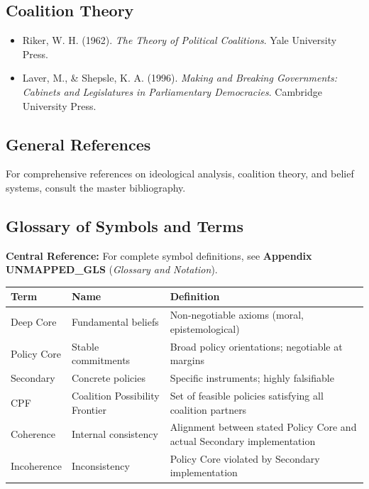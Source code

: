 \subsection{Coalition Theory}

\begin{itemize}[nosep]
\item Riker, W. H. (1962). \textit{The Theory of Political Coalitions}. Yale University Press.

\item Laver, M., \& Shepsle, K. A. (1996). \textit{Making and Breaking Governments: Cabinets and Legislatures in Parliamentary Democracies}. Cambridge University Press.

\end{itemize}

\nocite{bcm_master}

\subsection{General References}

For comprehensive references on ideological analysis, coalition theory, and belief systems, consult the master bibliography.

\subsection{Glossary of Symbols and Terms}

\begin{tcolorbox}[colback=blue!5!white, colframe=blue!75!black]
\textbf{Central Reference:} For complete symbol definitions, see
\textbf{Appendix UNMAPPED_GLS} (\textit{Glossary and Notation}).
\end{tcolorbox}

\begin{table}[h]
\centering
\small
\renewcommand{\arraystretch}{1.3}
\begin{tabular}{@{}llp{6cm}@{}}
\toprule
\textbf{Term} & \textbf{Name} & \textbf{Definition} \\
\midrule
Deep Core & Fundamental beliefs & Non-negotiable axioms (moral, epistemological) \\
Policy Core & Stable commitments & Broad policy orientations; negotiable at margins \\
Secondary & Concrete policies & Specific instruments; highly falsifiable \\
CPF & Coalition Possibility Frontier & Set of feasible policies satisfying all coalition partners \\
Coherence & Internal consistency & Alignment between stated Policy Core and actual Secondary implementation \\
Incoherence & Inconsistency & Policy Core violated by Secondary implementation \\
\bottomrule
\end{tabular}
\end{table}

